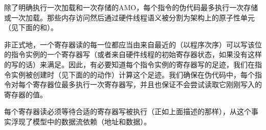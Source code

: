 除了明确执行一次加载和一次存储的AMO，每个指令的伪代码最多执行一次存储或一次加载。那些内存访问然后通过硬件线程语义被分割为架构上的原子性单元（见下面的和）。

非正式地，一个寄存器读的每一位都应当由来自最近的（以程序次序）可以写该位的指令实例的一个寄存器写（或者来自硬件线程的初始寄存器状态，如果没有这样的写的话）来满足。因此，有必要知道每个指令实例的寄存器写的足迹，我们在指令实例被创建时（见下面的的动作）计算这个足迹。我们确保在伪代码中，每个指令对每个寄存器位最多执行一次寄存器写，并且也保证不会尝试读取它刚刚写入的寄存器的值。

每个寄存器读必须等待合适的寄存器写被执行（正如上面描述的那样），从这个事实浮现了模型中的数据流依赖（地址和数据）。

